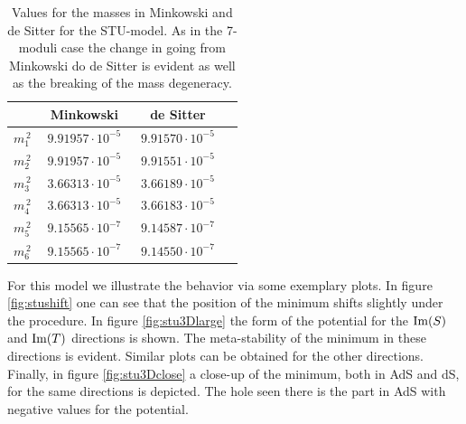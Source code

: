 \documentclass[12pt]{report}
\def\rmim{{\rm Im}}
\begin{document}
\begin{table}[htb]
\centering
\begin{tabular}{|c|c|c|c|}\hline
&  Minkowski  & de Sitter \\\hline
$m_1^{\,2}$ & $\; 9.91957 \cdot 10^{-5} \;$ & $\; 9.91570 \cdot 10^{-5} \;$ \\\hline
$m_2^{\,2}$ & $\; 9.91957 \cdot 10^{-5} \;$ & $\; 9.91551 \cdot 10^{-5} \;$ \\\hline
$m_3^{\,2}$ & $\; 3.66313 \cdot 10^{-5} \;$ & $\; 3.66189 \cdot 10^{-5} \;$ \\\hline
$m_4^{\,2}$ & $\; 3.66313 \cdot 10^{-5} \;$ & $\; 3.66183 \cdot 10^{-5} \;$ \\\hline
$m_5^{\,2}$ & $\; 9.15565 \cdot 10^{-7} \;$ & $\; 9.14587 \cdot 10^{-7} \;$ \\\hline
$m_6^{\,2}$ & $\; 9.15565 \cdot 10^{-7} \;$ & $\; 9.14550 \cdot 10^{-7} \;$ \\\hline
\end{tabular}
\caption{  Values for the masses in Minkowski and de Sitter for the STU-model. As in the 7-moduli case the change in  going from Minkowski do de Sitter is evident as well as the breaking of the mass degeneracy.}
\label{tab:stumass}
\end{table} For this model we illustrate the behavior via some exemplary plots. In figure \ref{fig:stushift} one can see that the position of the minimum shifts slightly under the procedure. In figure \ref{fig:stu3Dlarge} the form of the potential for the $\rmim(S)$ and $\rmim(T)$ directions is shown. The meta-stability of the minimum in these directions is evident. Similar plots can be obtained for the other directions. Finally, in figure \ref{fig:stu3Dclose} a close-up of the minimum, both in AdS and dS, for the same directions is depicted. The hole seen there is the part in AdS with negative values for the potential.
\end{document}
